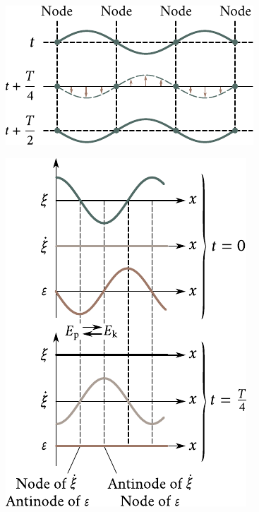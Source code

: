 \begin{figure}[!htb]
	\begin{minipage}[t]{0.48\linewidth}
		\begin{center}
			\includegraphics[scale=0.98]{figures/ch_14/fig_14_10.pdf}
			\caption[]{}
			\label{fig:14_10}
		\end{center}
	\end{minipage}
	\hfill{ }%
	\begin{minipage}[t]{0.48\linewidth}
		\begin{center}
			\includegraphics[scale=0.98]{figures/ch_14/fig_14_11.pdf}
			\caption[]{}
			\label{fig:14_11}
		\end{center}
	\end{minipage}
\vspace{-0.4cm}
\end{figure}

